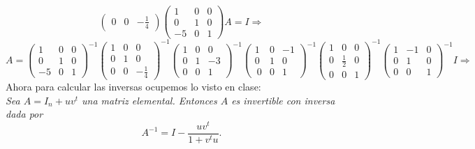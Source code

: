\documentclass[11pt,letterpaper]{article}
\begin{document}
\begin{enumerate}
\begin{equation*}
\begin{pmatrix}
 0 & 0 & -\frac{1}{4}
\end{pmatrix}
\begin{pmatrix}
 1 & 0 & 0\\
 0 & 1 & 0\\
-5 & 0 & 1
\end{pmatrix}A=I \Rightarrow
\end{equation*}
\begin{equation*}
A=\begin{pmatrix}
 1 & 0 & 0\\
 0 & 1 & 0\\
-5 & 0 & 1
\end{pmatrix}^{-1}\begin{pmatrix}
 1 & 0 & 0\\
 0 & 1 & 0\\
 0 & 0 & -\frac{1}{4}
\end{pmatrix}^{-1}\begin{pmatrix}
 1 & 0 & 0\\
 0 & 1 & -3\\
 0 & 0 & 1
\end{pmatrix}^{-1}
\begin{pmatrix}
 1 & 0 & -1\\
 0 & 1 & 0\\\
 0 & 0 & 1
\end{pmatrix}^{-1}
\begin{pmatrix}
 1 & 0 & 0\\
 0 & \frac{1}{2} & 0\\
 0 & 0 & 1
\end{pmatrix}^{-1}\begin{pmatrix}
 1 &-1 & 0\\
 0 & 1 & 0\\
 0 & 0 & 1
\end{pmatrix}^{-1}I \Rightarrow 
\end{equation*}
Ahora para calcular las inversas ocupemos lo visto en clase:\\
\textit{Sea $A=I_n+uv^t$ una matriz elemental. Entonces $A$ es invertible con inversa dada por}
$$A^{-1}=I-\frac{uv^t}{1+v^tu}.$$ 



\end{enumerate}
\end{document}
